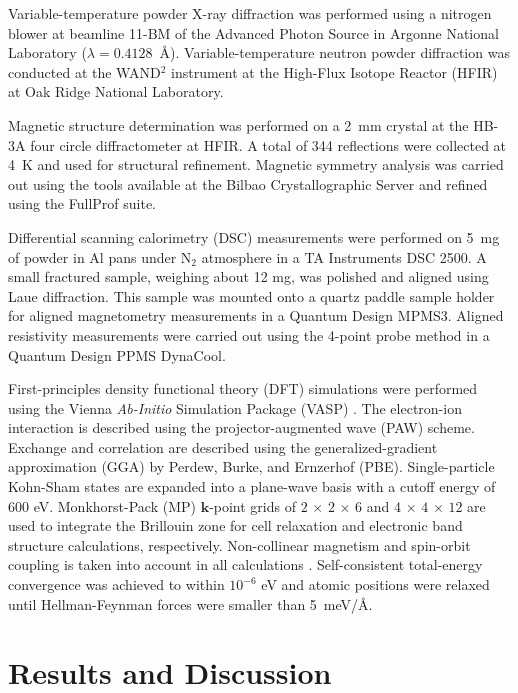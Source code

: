 \documentclass[10pt,doublespacing,edeposit]{uiucthesis2020}
\begin{document}
\begin{mainmatter}
Variable-temperature powder X-ray diffraction was performed using a nitrogen blower at beamline 11-BM of the Advanced Photon Source in Argonne National Laboratory ($\lambda = 0.4128$~\AA).\cite{wang_dedicated_2008} Variable-temperature neutron powder diffraction was conducted at the WAND$^2$ instrument at the High-Flux Isotope Reactor (HFIR) at Oak Ridge National Laboratory.\cite{Frontzek_new}


Magnetic structure determination was performed on a 2~mm crystal at the HB-3A four circle diffractometer at HFIR. A total of 344 reflections were collected at 4~K and used for structural refinement. Magnetic symmetry analysis was carried out using the tools available at the Bilbao Crystallographic Server\cite{perez-mato_symmetry-based_2015}
and refined using the FullProf suite.\cite{rodriguez-carvajal_recent_1993}

Differential scanning calorimetry (DSC) measurements were performed on 5~mg of powder in Al pans under N$_2$ atmosphere in a TA Instruments DSC 2500. A small fractured sample, weighing about 12 mg, was polished and aligned using Laue diffraction. This sample was mounted onto a quartz paddle sample holder for aligned magnetometry measurements in a Quantum Design MPMS3. Aligned resistivity measurements were carried out using the 4-point probe method in a Quantum Design PPMS DynaCool.

First-principles density functional theory (DFT) simulations were performed using the Vienna \emph{Ab-Initio} Simulation Package  (VASP) \cite{Kresse:1996,Kresse:1999}. The electron-ion interaction is described using the projector-augmented wave (PAW) scheme.\cite{Blochl:1994} Exchange and correlation are described using the generalized-gradient approximation (GGA) by Perdew, Burke, and Ernzerhof  (PBE).\cite{Perdew:1997} Single-particle Kohn-Sham states are expanded into a plane-wave basis with a cutoff energy of 600 eV. Monkhorst-Pack \cite{Monkhorst:1976} (MP) $\mathbf{k}$-point grids of $2\,\times\,2\,\times\,6$ and $4\,\times\,4\,\times\,12$ are used to integrate the Brillouin zone for cell relaxation and electronic band structure calculations, respectively.
Non-collinear magnetism and spin-orbit coupling is taken into account in all calculations \cite{Steiner:2016}.
Self-consistent total-energy convergence was achieved to within $10^{-6}$ eV and atomic positions were relaxed until Hellman-Feynman forces were smaller than 5~meV/\AA.

\section{Results and Discussion}


\end{mainmatter}
\end{document}
